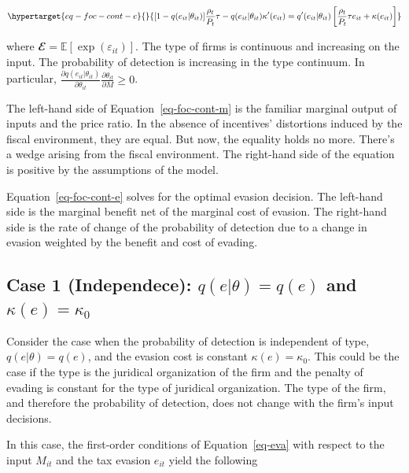 \documentclass[
  12pt]{article}
\begin{document}
\begin{equation}\protect\hypertarget{eq-foc-cont-e}{}{
[1-q(e_{it}|\theta_{it})]\frac{\rho_t}{P_t}\tau-q(e_{it}|\theta_{it})\kappa'(e_{it})=q'(e_{it}|\theta_{it})\left[\frac{\rho_t}{P_t}\tau e_{it} + \kappa(e_{it})\right]
}\label{eq-foc-cont-e}\end{equation}

where \(\mathbfcal{E}=\mathbb{E}[\exp(\varepsilon_{it})]\). The type of
firms is continuous and increasing on the input. The probability of
detection is increasing in the type continuum. In particular,
\(\frac{\partial q(e_{it}|\theta_{it})}{\partial \theta_{it}}\frac{\partial \theta_{it}}{\partial M}\ge0\).

The left-hand side of Equation~\ref{eq-foc-cont-m} is the familiar
marginal output of inputs and the price ratio. In the absence of
incentives' distortions induced by the fiscal environment, they are
equal. But now, the equality holds no more. There's a wedge arising from
the fiscal environment. The right-hand side of the equation is positive
by the assumptions of the model.

Equation~\ref{eq-foc-cont-e} solves for the optimal evasion decision.
The left-hand side is the marginal benefit net of the marginal cost of
evasion. The right-hand side is the rate of change of the probability of
detection due to a change in evasion weighted by the benefit and cost of
evading.

\hypertarget{case-1-independece-qethetaqe-and-kappaekappa_0}{%
\subsection{\texorpdfstring{Case 1 (Independece): \(q(e|\theta)=q(e)\)
and
\(\kappa(e)=\kappa_0\)}{Case 1 (Independece): q(e\textbar\textbackslash theta)=q(e) and \textbackslash kappa(e)=\textbackslash kappa\_0}}\label{case-1-independece-qethetaqe-and-kappaekappa_0}}

Consider the case when the probability of detection is independent of
type, \(q(e|\theta)=q(e)\), and the evasion cost is constant
\(\kappa(e)=\kappa_0\). This could be the case if the type is the
juridical organization of the firm and the penalty of evading is
constant for the type of juridical organization. The type of the firm,
and therefore the probability of detection, does not change with the
firm's input decisions.

In this case, the first-order conditions of Equation~\ref{eq-eva} with
respect to the input \(M_{it}\) and the tax evasion \(e_{it}\) yield the
following
\end{document}
